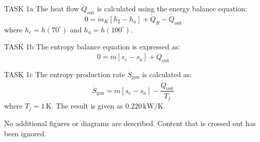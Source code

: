 TASK 1a  
The heat flow \( \dot{Q}_{\text{out}} \) is calculated using the energy balance equation:  
\[
0 = \dot{m}_K \left[ h_2 - h_a \right] + \dot{Q}_R - \dot{Q}_{\text{out}}
\]  
where \( h_e = h(70^\circ) \) and \( h_a = h(100^\circ) \).

TASK 1b  
The entropy balance equation is expressed as:  
\[
0 = \dot{m} \left[ s_e - s_a \right] + \dot{Q}_{\text{out}}
\]

TASK 1c  
The entropy production rate \( \dot{S}_{\text{gen}} \) is calculated as:  
\[
\dot{S}_{\text{gen}} = \dot{m} \left[ s_e - s_a \right] - \frac{\dot{Q}_{\text{out}}}{T_j}
\]  
where \( T_j = 1 \, \text{K} \).  
The result is given as \( 0.220 \, \text{kW/K} \).

No additional figures or diagrams are described. Content that is crossed out has been ignored.